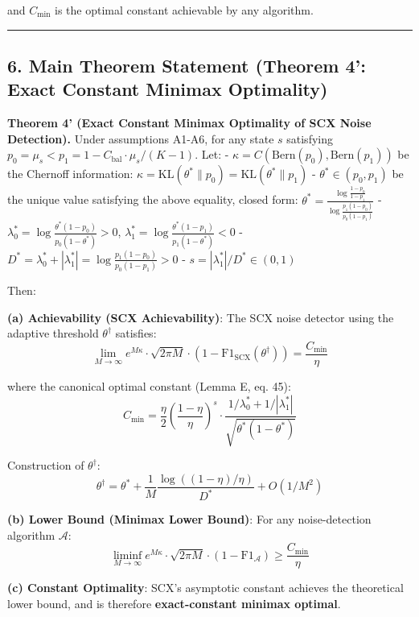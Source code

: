 \documentclass[
  12pt,
]{ctexart}
\begin{document}
and \(C_{\min}\) is the optimal constant achievable by any algorithm.

\begin{center}\rule{0.5\linewidth}{0.5pt}\end{center}

\subsection{6. Main Theorem Statement (Theorem 4': Exact Constant Minimax Optimality)}\label{main-theorem-statement-theorem-4-exact-constant-minimax-optimality}

\textbf{Theorem 4' (Exact Constant Minimax Optimality of SCX Noise Detection).} Under assumptions A1-A6, for any state \(s\) satisfying \(p_0 = \mu_s < p_1 = 1 - C_{\text{bal}} \cdot \mu_s/(K-1)\). Let:
- \(\kappa = C(\text{Bern}(p_0), \text{Bern}(p_1))\) be the Chernoff information: \(\kappa = \text{KL}(\theta^* \| p_0) = \text{KL}(\theta^* \| p_1)\)
- \(\theta^* \in (p_0, p_1)\) be the unique value satisfying the above equality, closed form: \(\theta^* = \frac{\log\frac{1-p_0}{1-p_1}}{\log\frac{p_1(1-p_0)}{p_0(1-p_1)}}\)
- \(\lambda_0^* = \log\frac{\theta^*(1-p_0)}{p_0(1-\theta^*)} > 0\), \(\lambda_1^* = \log\frac{\theta^*(1-p_1)}{p_1(1-\theta^*)} < 0\)
- \(D^* = \lambda_0^* + |\lambda_1^*| = \log\frac{p_1(1-p_0)}{p_0(1-p_1)} > 0\)
- \(s = |\lambda_1^*| / D^* \in (0,1)\)

Then:

\textbf{(a) Achievability (SCX Achievability)}: The SCX noise detector using the adaptive threshold \(\theta^\dagger\) satisfies:
\[\lim_{M\to\infty} e^{M\kappa} \cdot \sqrt{2\pi M} \cdot (1 - \text{F1}_{\text{SCX}}(\theta^\dagger)) = \frac{C_{\min}}{\eta}\]

where the canonical optimal constant (Lemma E, eq. 45):
\[\boxed{C_{\min} = \frac{\eta}{2} \left(\frac{1-\eta}{\eta}\right)^{s} \cdot \frac{1/\lambda_0^* + 1/|\lambda_1^*|}{\sqrt{\theta^*(1-\theta^*)}}}\]

Construction of \(\theta^\dagger\):
\[\theta^\dagger = \theta^* + \frac{1}{M}\frac{\log((1-\eta)/\eta)}{D^*} + O(1/M^2)\]

\textbf{(b) Lower Bound (Minimax Lower Bound)}: For any noise-detection algorithm \(\mathcal{A}\):
\[\liminf_{M\to\infty} e^{M\kappa} \cdot \sqrt{2\pi M} \cdot (1 - \text{F1}_{\mathcal{A}}) \geq \frac{C_{\min}}{\eta}\]

\textbf{(c) Constant Optimality}: SCX's asymptotic constant achieves the theoretical lower bound, and is therefore \textbf{exact-constant minimax optimal}.
\end{document}
